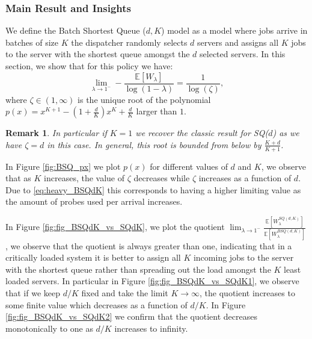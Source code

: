 \documentclass[12pt]{report}
\newcommand{\E}{\mathbb{E}}
\newtheorem{remark}{Remark}
\begin{document}
\subsubsection{Main Result and Insights}
We define the Batch Shortest Queue ($d,K$) model as a model where jobs arrive in batches of size $K$ the dispatcher randomly selects $d$ servers and assigns all $K$ jobs to the server with the shortest queue amongst the $d$ selected servers. In this section, we show that for this policy we have:
\begin{equation}\label{eq:heavy_BSQdK}
\lim_{\lambda \rightarrow 1^-} - \frac{\E[W_\lambda]}{\log(1-\lambda)} = \frac{1}{\log(\zeta)},
\end{equation}
where $\zeta \in (1,\infty)$ is the unique root of the polynomial $p(x)=x^{K+1} - (1+\frac{d}{K})x^K+\frac{d}{K}$ larger than $1$.

\begin{remark}
In particular if $K=1$ we recover the classic result for SQ($d$) as we have $\zeta=d$ in this case. In general, this root is bounded from below by $\frac{K+d}{K+1}$.
\end{remark}

In Figure \ref{fig:BSQ_px} we plot $p(x)$ for different values of $d$ and $K$, we observe that as $K$ increases, the value of $\zeta$ decreases while $\zeta$ increases as a function of $d$. Due to \eqref{eq:heavy_BSQdK} this corresponds to having a higher limiting value as the amount of probes used per arrival increases.

In Figure \ref{fig:fig_BSQdK_vs_SQdK}, we plot the quotient $\lim_{\lambda \rightarrow 1^-} \frac{\E[W_\lambda^{SQ(d,K)}]}{\E[W_\lambda^{BSQ(d,K)}]}$, we observe that the quotient is always greater than one, indicating that in a critically loaded system it is better to assign all $K$ incoming jobs to the server with the shortest queue rather than spreading out the load amongst the $K$ least loaded servers. In particular in Figure \ref{fig:fig_BSQdK_vs_SQdK1}, we observe that if we keep $d/K$ fixed and take the limit $K \rightarrow \infty$, the quotient increases to some finite value which decreases as a function of $d/K$. In Figure \ref{fig:fig_BSQdK_vs_SQdK2} we confirm that the quotient decreases monotonically to one as $d/K$ increases to infinity.
\end{document}
